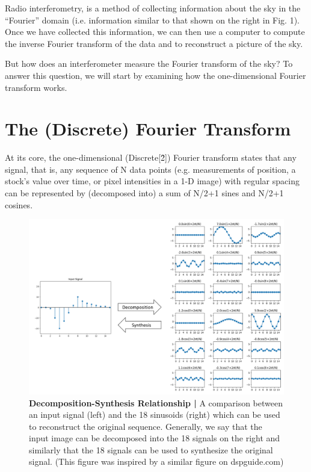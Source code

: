 \documentclass[12pt,a4paper]{article}
\begin{document}
  Radio interferometry, is a method of collecting information about the sky in the “Fourier” domain (i.e. information similar to that shown on the right in Fig. 1). Once we have collected this information, we can then use a computer to compute the inverse Fourier transform of the data and to reconstruct a picture of the sky. 
	
  But how does an interferometer measure the Fourier transform of the sky? To answer this question, we will start by examining how the one-dimensional Fourier transform works. 

\section{The (Discrete) Fourier Transform}
  At its core, the one-dimensional (Discrete[\^2]) Fourier transform states that any signal, that is, any sequence of N data points (e.g. measurements of position, a stock’s value over time, or pixel intensities in a 1-D image) with regular spacing can be represented by (decomposed into) a sum of N/2+1 sines and N/2+1 cosines. 
  
  
  
\begin{figure}
\centering
\includegraphics[width=\textwidth]{_images/DecompSynth.png}
\caption{\textbf{ Decomposition-Synthesis Relationship |} A comparison between an input signal (left) and the 18 sinusoids (right) which can be used to reconstruct the original sequence. Generally, we say that the input image can be decomposed into the 18 signals on the right and similarly that the 18 signals can be used to synthesize the original signal. (This figure was inspired by a similar figure on dspguide.com)
}\label{fig:deco}
\end{figure}
\end{document}
